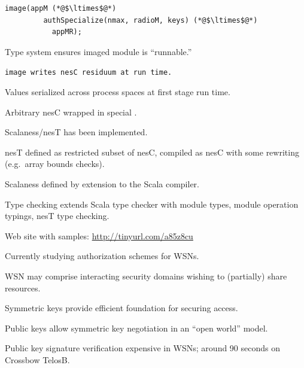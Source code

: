 \begin{citemize}
\item \color{black}{Types constructed during first stage execution.}
\item \color{black}{Values lifted from one stage to the next only at module instantiation.}
\item \color{red}{Wiring operator composes fully instantiated modules.}
\end{citemize}
\stopslide


\begin{lstlisting}[language=scalaness]
 image(appM (*@$\ltimes$@*)
         authSpecialize(nmax, radioM, keys) (*@$\ltimes$@*)
           appMR);
\end{lstlisting}
\begin{citemize}
  \item Type system ensures imaged module is ``runnable.''
  \item \tt{image} writes nesC residuum at run time.
  \item Values serialized across process spaces at first stage run time.
  \item Arbitrary nesC wrapped in special .
\end{citemize}
\stopslide


Scalaness/nesT has been implemented.
\begin{citemize}
\item nesT defined as restricted subset of nesC, compiled as nesC with some rewriting
  (e.g.~array bounds checks).
\item Scalaness defined by extension to the Scala compiler.
\item Type checking extends Scala type checker with module types, module operation typings, nesT
  type checking.
\end{citemize}
Web site with samples: \url{http://tinyurl.com/a85z8cu}
\stopslide


Currently studying authorization schemes for WSNs.
\begin{citemize}
\item WSN may comprise interacting security domains wishing to (partially) share resources.
\item Symmetric keys provide efficient foundation for securing access.
\item Public keys allow symmetric key negotiation in an ``open world'' model.
\end{citemize}
Public key signature verification expensive in WSNs; around 90 seconds on Crossbow TelosB.


